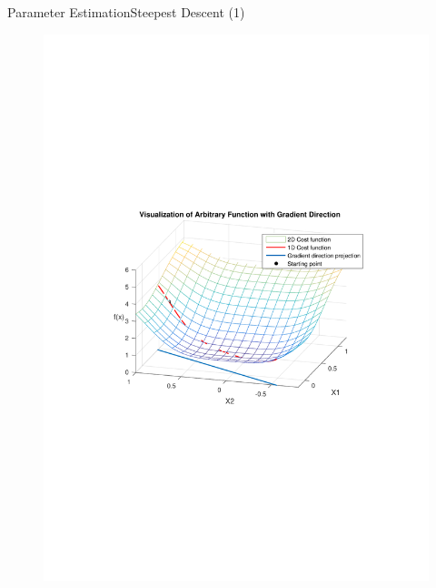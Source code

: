 \begin{frame}{Parameter Estimation}{Steepest Descent (1)}
  \begin{figure}[H]
    \centering
    \includegraphics[scale=0.28]{Pictures/gradientDIrection2D4}
  \end{figure}
\end{frame}


